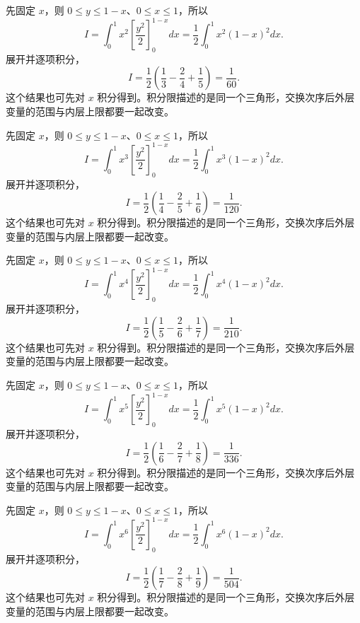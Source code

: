 \documentclass[12pt,fontset=fandol]{ctexart}
\begin{document}
\begin{solve}\label{ans:c36q9}
先固定 $x$，则 $0\le y\le1-x$、$0\le x\le1$，所以
\[
I=\int_0^1x^{2}\left[\frac{y^2}2\right]_0^{1-x}dx=\frac12\int_0^1x^{2}(1-x)^2dx.
\]
展开并逐项积分，
\[
I=\frac12\left(\frac1{3}-\frac2{4}+\frac1{5}\right)=\frac{1}{60}.
\]
这个结果也可先对 $x$ 积分得到。积分限描述的是同一个三角形，交换次序后外层变量的范围与内层上限都要一起改变。
\end{solve}

\begin{solve}\label{ans:c36q10}
先固定 $x$，则 $0\le y\le1-x$、$0\le x\le1$，所以
\[
I=\int_0^1x^{3}\left[\frac{y^2}2\right]_0^{1-x}dx=\frac12\int_0^1x^{3}(1-x)^2dx.
\]
展开并逐项积分，
\[
I=\frac12\left(\frac1{4}-\frac2{5}+\frac1{6}\right)=\frac{1}{120}.
\]
这个结果也可先对 $x$ 积分得到。积分限描述的是同一个三角形，交换次序后外层变量的范围与内层上限都要一起改变。
\end{solve}

\begin{solve}\label{ans:c36q11}
先固定 $x$，则 $0\le y\le1-x$、$0\le x\le1$，所以
\[
I=\int_0^1x^{4}\left[\frac{y^2}2\right]_0^{1-x}dx=\frac12\int_0^1x^{4}(1-x)^2dx.
\]
展开并逐项积分，
\[
I=\frac12\left(\frac1{5}-\frac2{6}+\frac1{7}\right)=\frac{1}{210}.
\]
这个结果也可先对 $x$ 积分得到。积分限描述的是同一个三角形，交换次序后外层变量的范围与内层上限都要一起改变。
\end{solve}

\begin{solve}\label{ans:c36q12}
先固定 $x$，则 $0\le y\le1-x$、$0\le x\le1$，所以
\[
I=\int_0^1x^{5}\left[\frac{y^2}2\right]_0^{1-x}dx=\frac12\int_0^1x^{5}(1-x)^2dx.
\]
展开并逐项积分，
\[
I=\frac12\left(\frac1{6}-\frac2{7}+\frac1{8}\right)=\frac{1}{336}.
\]
这个结果也可先对 $x$ 积分得到。积分限描述的是同一个三角形，交换次序后外层变量的范围与内层上限都要一起改变。
\end{solve}

\begin{solve}\label{ans:c36q13}
先固定 $x$，则 $0\le y\le1-x$、$0\le x\le1$，所以
\[
I=\int_0^1x^{6}\left[\frac{y^2}2\right]_0^{1-x}dx=\frac12\int_0^1x^{6}(1-x)^2dx.
\]
展开并逐项积分，
\[
I=\frac12\left(\frac1{7}-\frac2{8}+\frac1{9}\right)=\frac{1}{504}.
\]
这个结果也可先对 $x$ 积分得到。积分限描述的是同一个三角形，交换次序后外层变量的范围与内层上限都要一起改变。
\end{solve}
\end{document}
